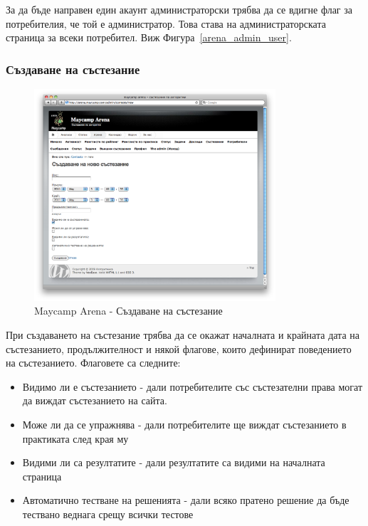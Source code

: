 \documentclass[a4paper,12pt]{article}
\begin{document}
  За да бъде направен един акаунт администраторски трябва да се вдигне флаг за потребителия, че той е администратор. Това става на администраторската страница за всеки потребител. Виж Фигура~\ref{arena_admin_user}.
  
  \pagebreak
  
  \subsubsection{Създаване на състезание}

  \begin{figure}[ht]
    \begin{center}
      \includegraphics[width=0.8\textwidth]{images/maycamp_arena_admin_contest.png}
    \end{center}
    \caption{Maycamp Arena - Създаване на състезание}
    \label{arena_admin_contest}
  \end{figure}
  
  При създаването на състезание трябва да се окажат началната и крайната дата на състезанието, продължителност и някой флагове, които дефинират поведението на състезанието. Флаговете са следните:
  \begin{itemize}
    \item Видимо ли е състезанието - дали потребителите със състезателни права могат да виждат състезанието на сайта.
    \item Може ли да се упражнява - дали потребителите ще виждат състезанието в практиката след края му
    \item Видими ли са резултатите - дали резултатите са видими на началната страница
    \item Автоматично тестване на решенията - дали всяко пратено решение да бъде тествано веднага срещу всички тестове
  \end{itemize}
  
\end{document}
